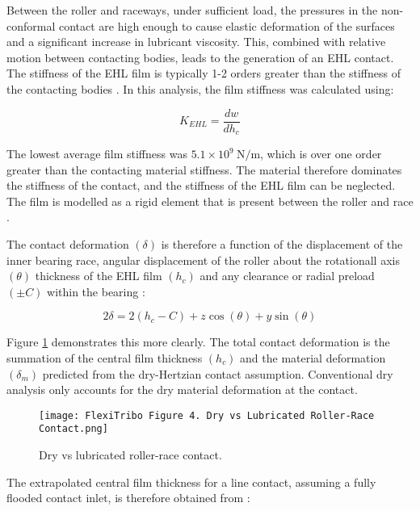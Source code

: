 Between the roller and raceways, under sufficient load, the pressures in the non-conformal contact are high enough to cause elastic deformation of the surfaces and a significant increase in lubricant viscosity. This, combined with relative motion between contacting bodies, leads to the generation of an EHL contact. The stiffness of the EHL film is typically 1-2 orders greater than the stiffness of the contacting bodies \cite{Dietl1997}. In this analysis, the film stiffness was calculated using:

\begin{equation}\label{Film stiffness}
	K_{E H L}=\frac{d w}{d h_c}
\end{equation}

The lowest average film stiffness was $5.1 \times 10^9 \mathrm{~N} / \mathrm{m}$, which is over one order greater than the contacting material stiffness. The material therefore dominates the stiffness of the contact, and the stiffness of the EHL film can be neglected. The film is modelled as a rigid element that is present between the roller and race \cite{Walford1983} \cite{Dareing1975} \cite{Mehdigoli1990}.

The contact deformation $(\delta)$ is therefore a function of the displacement of the inner bearing race, angular displacement of the roller about the rotationall axis $(\theta)$ thickness of the EHL film $\left(h_c\right)$ and any clearance or radial preload $( \pm C)$ within the bearing \cite{Rahnejat1985} \cite{Mohammadpour2015c}:

\begin{equation}\label{Contact deformation flextribo}
	2 \delta=2\left(h_c-C\right)+z \cos (\theta)+y \sin (\theta)
\end{equation}

Figure \ref{Dry vs lubricated roller-race contact} demonstrates this more clearly. The total contact deformation is the summation of the central film thickness $\left(h_c\right)$ and the material deformation $\left(\delta_m\right)$ predicted from the dry-Hertzian contact assumption. Conventional dry analysis only accounts for the dry material deformation at the contact.

\begin{figure}  
	\texttt{[image: FlexiTribo Figure 4. Dry vs Lubricated Roller-Race Contact.png]}
	\caption{Dry vs lubricated roller-race contact.}
	\label{Dry vs lubricated roller-race contact}
\end{figure} 

The extrapolated central film thickness for a line contact, assuming a fully flooded contact inlet, is therefore obtained from \cite{Dowson1979}: 

